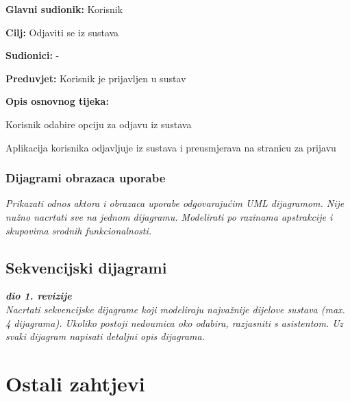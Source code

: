 					\noindent {}
					\begin{packed_item}
	
						\item \textbf{Glavni sudionik:} Korisnik
						\item  \textbf{Cilj:} Odjaviti se iz sustava
						\item  \textbf{Sudionici:} -
						\item  \textbf{Preduvjet:} Korisnik je prijavljen u sustav
						\item  \textbf{Opis osnovnog tijeka:}
						
						\item[] \begin{packed_enum}
	
							\item Korisnik odabire opciju za odjavu iz sustava
							\item Aplikacija korisnika odjavljuje iz sustava i preusmjerava na stranicu za prijavu

						\end{packed_enum}

					\end{packed_item}

				\eject{}
					
				\subsubsection{Dijagrami obrazaca uporabe}
					
					\textit{Prikazati odnos aktora i obrazaca uporabe odgovarajućim UML dijagramom. Nije nužno nacrtati sve na jednom dijagramu. Modelirati po razinama apstrakcije i skupovima srodnih funkcionalnosti.}
				\eject{}
				
			\subsection{Sekvencijski dijagrami}
				
				\textbf{\textit{dio 1. revizije}}\\
				
				\textit{Nacrtati sekvencijske dijagrame koji modeliraju najvažnije dijelove sustava (max. 4 dijagrama). Ukoliko postoji nedoumica oko odabira, razjasniti s asistentom. Uz svaki dijagram napisati detaljni opis dijagrama.}
			\eject{}
	
		\section{Ostali zahtjevi}
		
